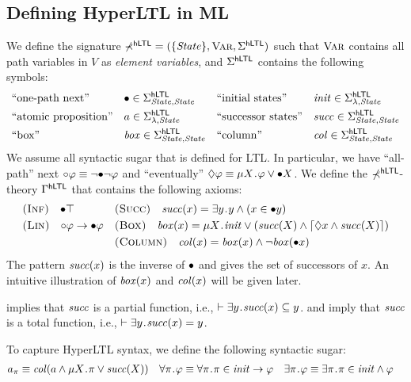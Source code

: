 \documentclass{amsart}
\begin{document}
\subsection{Defining HyperLTL in ML}

We define the signature
$\mathbb{\Sigma}^{\mathsf{hLTL}} = ( \{\mathit{State}\} , {\normalfont\textsc{Var}}, \Sigma^{\mathsf{hLTL}})$ such that
${\normalfont\textsc{Var}}$ contains all path variables in $V$ as \emph{element variables},
and $\Sigma^{\mathsf{hLTL}}$ contains the following symbols:
\begin{align*}
&  \text{``one-path next''} && {\bullet} \in \Sigma^{\mathsf{hLTL}}_{\mathit{State} , \mathit{State}}
&& \text{``initial states''} && \mathit{init} \in \Sigma^{\mathsf{hLTL}}_{\lambda , \mathit{State}}
\\
&  \text{``atomic proposition''} && a \in \Sigma^{\mathsf{hLTL}}_{\lambda , \mathit{State}}
&& \text{``successor states''} && \mathit{succ} \in \Sigma^{\mathsf{hLTL}}_{\mathit{State} , \mathit{State}}
\\
&  \text{``box''} && \mathit{box} \in \Sigma^{\mathsf{hLTL}}_{\mathit{State} , \mathit{State}}
&& \text{``column''} && \mathit{col} \in \Sigma^{\mathsf{hLTL}}_{\mathit{State} , \mathit{State}}
\end{align*}
We assume all syntactic sugar that is defined for LTL.
In particular, we have ``all-path'' next
${\circ} \varphi \equiv \neg {\bullet} \neg \varphi$ 
and ``eventually'' ${\lozenge} \varphi \equiv \mu X \mathbin{\!.\!} \varphi \vee {\bullet} 
X$.
We define the $\mathbb{\Sigma}^{\mathsf{hLTL}}$-theory $\Gamma^{\mathsf{hLTL}}$ that contains the following 
axioms:
\begin{align*}
& \textnormal{\textsc{(Inf)}} \quad {\bullet} \top
&&  \textnormal{\textsc{(Succ)}} \quad \mathit{succ}(x) = \exists y \mathbin{\!.\!} y \wedge (x \in {\bullet} y)
\\
&  \textnormal{\textsc{(Lin)}} \quad {\circ} \varphi \to {\bullet} \varphi
&& \textnormal{\textsc{(Box)}} \quad \mathit{box}(x) = 
   \mu X \mathbin{\!.\!} \mathit{init} \vee 
   (\mathit{succ}(X) \wedge \lceil{\lozenge} x \wedge \mathit{succ}(X)\rceil)
\\
&&&  \textnormal{\textsc{(Column)}} \quad \mathit{col}(x) = \mathit{box}(x) \wedge \neg \mathit{box}({\bullet} x)
\end{align*}
The pattern $\mathit{succ}(x)$ is the inverse of ${\bullet}$ and gives the set
of successors of $x$.
An intuitive illustration of $\mathit{box}(x)$ and $\mathit{col}(x)$ will be given later.

\begin{lemma}
 implies that $\mathit{succ}$ is a partial function,
i.e., $\vdash \exists y \mathbin{\!.\!} \mathit{succ}(x) \subseteq y$.
 and  imply that $\mathit{succ}$ is a total function,
i.e., $\vdash \exists y \mathbin{\!.\!} \mathit{succ}(x) = y$.
\end{lemma}


To capture HyperLTL syntax, we define the following syntactic sugar:
\begin{align*}
& a_\pi \equiv \col(a \wedge \mu X \ldot \pi \vee \succit(X))
&& \forall \pi \ldot \varphi \equiv \forall \pi \ldot \pi \in \init \imp \varphi
&& \exists \pi \ldot \varphi \equiv \exists \pi \ldot \pi \in \init \wedge 
\varphi
\end{align*}
\end{document}
